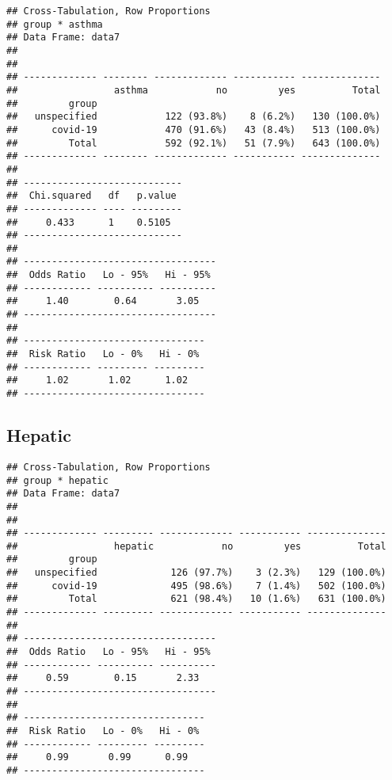 \documentclass[
]{article}
\newenvironment{Shaded}{\begin{snugshade}}{\end{snugshade}}
\newcommand{\DataTypeTok}[1]{\textcolor[rgb]{0.13,0.29,0.53}{#1}}
\newcommand{\KeywordTok}[1]{\textcolor[rgb]{0.13,0.29,0.53}{\textbf{#1}}}
\newcommand{\NormalTok}[1]{#1}
\newcommand{\OperatorTok}[1]{\textcolor[rgb]{0.81,0.36,0.00}{\textbf{#1}}}
\newcommand{\OtherTok}[1]{\textcolor[rgb]{0.56,0.35,0.01}{#1}}
\newcommand{\StringTok}[1]{\textcolor[rgb]{0.31,0.60,0.02}{#1}}
\begin{document}
\begin{verbatim}
## Cross-Tabulation, Row Proportions  
## group * asthma  
## Data Frame: data7  
## 
## 
## ------------- -------- ------------- ----------- --------------
##                 asthma            no         yes          Total
##         group                                                  
##   unspecified            122 (93.8%)    8 (6.2%)   130 (100.0%)
##      covid-19            470 (91.6%)   43 (8.4%)   513 (100.0%)
##         Total            592 (92.1%)   51 (7.9%)   643 (100.0%)
## ------------- -------- ------------- ----------- --------------
## 
## ----------------------------
##  Chi.squared   df   p.value 
## ------------- ---- ---------
##     0.433      1    0.5105  
## ----------------------------
## 
## ----------------------------------
##  Odds Ratio   Lo - 95%   Hi - 95% 
## ------------ ---------- ----------
##     1.40        0.64       3.05   
## ----------------------------------
## 
## --------------------------------
##  Risk Ratio   Lo - 0%   Hi - 0% 
## ------------ --------- ---------
##     1.02       1.02      1.02   
## --------------------------------
\end{verbatim}

\hypertarget{hepatic}{%
\subsection{Hepatic}\label{hepatic}}

\begin{Shaded}
\end{Shaded}

\begin{verbatim}
## Cross-Tabulation, Row Proportions  
## group * hepatic  
## Data Frame: data7  
## 
## 
## ------------- --------- ------------- ----------- --------------
##                 hepatic            no         yes          Total
##         group                                                   
##   unspecified             126 (97.7%)    3 (2.3%)   129 (100.0%)
##      covid-19             495 (98.6%)    7 (1.4%)   502 (100.0%)
##         Total             621 (98.4%)   10 (1.6%)   631 (100.0%)
## ------------- --------- ------------- ----------- --------------
## 
## ----------------------------------
##  Odds Ratio   Lo - 95%   Hi - 95% 
## ------------ ---------- ----------
##     0.59        0.15       2.33   
## ----------------------------------
## 
## --------------------------------
##  Risk Ratio   Lo - 0%   Hi - 0% 
## ------------ --------- ---------
##     0.99       0.99      0.99   
## --------------------------------
\end{verbatim}
\end{document}
